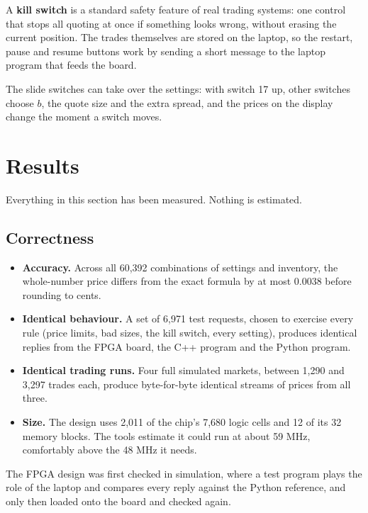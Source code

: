 \documentclass[11pt]{article}
\newcommand{\cent}{\textcent}
\begin{document}
A \textbf{kill switch} is a standard safety feature of real trading systems:
one control that stops all quoting at once if something looks wrong, without
erasing the current position. The trades themselves are stored on the laptop,
so the restart, pause and resume buttons work by sending a short message to
the laptop program that feeds the board.

The slide switches can take over the settings: with switch 17 up, other
switches choose $b$, the quote size and the extra spread, and the prices on
the display change the moment a switch moves.

\section{Results}

Everything in this section has been measured. Nothing is estimated.

\subsection{Correctness}

\begin{itemize}
  \item \textbf{Accuracy.} Across all 60{,}392 combinations of settings and
        inventory, the whole-number price differs from the exact formula by
        at most 0.0038\cent{} before rounding to cents.
  \item \textbf{Identical behaviour.} A set of 6{,}971 test requests, chosen
        to exercise every rule (price limits, bad sizes, the kill switch,
        every setting), produces identical replies from the FPGA board, the
        C++ program and the Python program.
  \item \textbf{Identical trading runs.} Four full simulated markets, between
        1{,}290 and 3{,}297 trades each, produce byte-for-byte identical
        streams of prices from all three.
  \item \textbf{Size.} The design uses 2{,}011 of the chip's 7{,}680 logic
        cells and 12 of its 32 memory blocks. The tools estimate it could run
        at about 59 MHz, comfortably above the 48 MHz it needs.
\end{itemize}

The FPGA design was first checked in simulation, where a test program plays
the role of the laptop and compares every reply against the Python reference,
and only then loaded onto the board and checked again.
\end{document}
